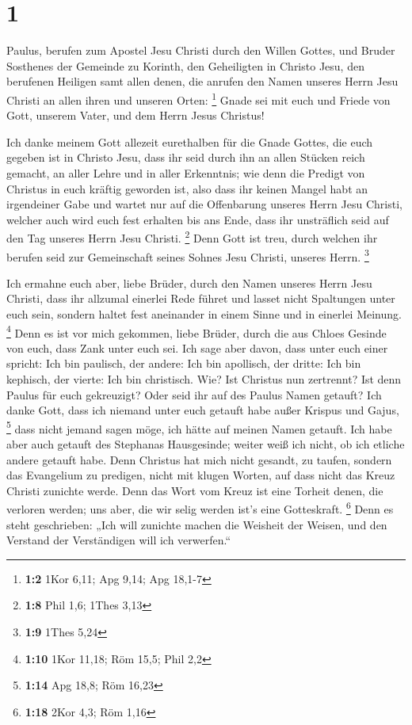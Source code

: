\hypertarget{section}{%
\section{1}\label{section}}

 Paulus, berufen zum Apostel Jesu Christi durch den Willen
Gottes, und Bruder Sosthenes  der Gemeinde zu Korinth, den
Geheiligten in Christo Jesu, den berufenen Heiligen samt allen denen,
die anrufen den Namen unseres Herrn Jesu Christi an allen ihren und
unseren Orten: \footnote{\textbf{1:2} 1Kor 6,11; Apg 9,14; Apg 18,1-7}
 Gnade sei mit euch und Friede von Gott, unserem Vater,
und dem Herrn Jesus Christus!

 Ich danke meinem Gott allezeit eurethalben für die Gnade
Gottes, die euch gegeben ist in Christo Jesu,  dass ihr
seid durch ihn an allen Stücken reich gemacht, an aller Lehre und in
aller Erkenntnis;  wie denn die Predigt von Christus in
euch kräftig geworden ist,  also dass ihr keinen Mangel
habt an irgendeiner Gabe und wartet nur auf die Offenbarung unseres
Herrn Jesu Christi,  welcher auch wird euch fest erhalten
bis ans Ende, dass ihr unsträflich seid auf den Tag unseres Herrn Jesu
Christi. \footnote{\textbf{1:8} Phil 1,6; 1Thes 3,13} 
Denn Gott ist treu, durch welchen ihr berufen seid zur Gemeinschaft
seines Sohnes Jesu Christi, unseres Herrn. \footnote{\textbf{1:9} 1Thes
  5,24}

 Ich ermahne euch aber, liebe Brüder, durch den Namen
unseres Herrn Jesu Christi, dass ihr allzumal einerlei Rede führet und
lasset nicht Spaltungen unter euch sein, sondern haltet fest aneinander
in einem Sinne und in einerlei Meinung. \footnote{\textbf{1:10} 1Kor
  11,18; Röm 15,5; Phil 2,2}  Denn es ist vor mich
gekommen, liebe Brüder, durch die aus Chloes Gesinde von euch, dass Zank
unter euch sei.  Ich sage aber davon, dass unter euch
einer spricht: Ich bin paulisch, der andere: Ich bin apollisch, der
dritte: Ich bin kephisch, der vierte: Ich bin christisch.
 Wie? Ist Christus nun zertrennt? Ist denn Paulus für
euch gekreuzigt? Oder seid ihr auf des Paulus Namen getauft?
 Ich danke Gott, dass ich niemand unter euch getauft habe
außer Krispus und Gajus, \footnote{\textbf{1:14} Apg 18,8; Röm 16,23}
 dass nicht jemand sagen möge, ich hätte auf meinen Namen
getauft.  Ich habe aber auch getauft des Stephanas
Hausgesinde; weiter weiß ich nicht, ob ich etliche andere getauft habe.
 Denn Christus hat mich nicht gesandt, zu taufen, sondern
das Evangelium zu predigen, nicht mit klugen Worten, auf dass nicht das
Kreuz Christi zunichte werde.  Denn das Wort vom Kreuz
ist eine Torheit denen, die verloren werden; uns aber, die wir selig
werden ist's eine Gotteskraft. \footnote{\textbf{1:18} 2Kor 4,3; Röm
  1,16}  Denn es steht geschrieben: „Ich will zunichte
machen die Weisheit der Weisen, und den Verstand der Verständigen will
ich verwerfen.``

